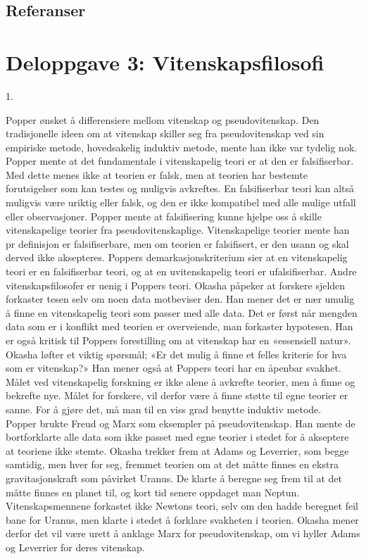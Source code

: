 \documentclass[
  letterpaper,
  DIV=11,
  numbers=noendperiod]{scrreprt}
\begin{document}
\hypertarget{referanser-1}{%
\section{Referanser}\label{referanser-1}}


\hypertarget{deloppgave-3-vitenskapsfilosofi}{%
\chapter{Deloppgave 3:
Vitenskapsfilosofi}\label{deloppgave-3-vitenskapsfilosofi}}

1.

Popper ønsket å differensiere mellom vitenskap og pseudovitenskap. Den
tradisjonelle ideen om at vitenskap skiller seg fra pseudovitenskap ved
sin empiriske metode, hovedsakelig induktiv metode, mente han ikke var
tydelig nok. Popper mente at det fundamentale i vitenskapelig teori er
at den er falsifiserbar. Med dette menes ikke at teorien er falsk, men
at teorien har bestemte forutsigelser som kan testes og muligvis
avkreftes. En falsifiserbar teori kan altså muligvis være uriktig eller
falsk, og den er ikke kompatibel med alle mulige utfall eller
observasjoner. Popper mente at falsifisering kunne hjelpe oss å skille
vitenskapelige teorier fra pseudovitenskaplige. Vitenskapelige teorier
mente han pr definisjon er falsifiserbare, men om teorien er
falsifisert, er den usann og skal derved ikke aksepteres. Poppers
demarkasjonskriterium sier at en vitenskapelig teori er en falsifiserbar
teori, og at en uvitenskapelig teori er ufalsifiserbar. Andre
vitenskapsfilosofer er uenig i Poppers teori. Okasha påpeker at forskere
sjelden forkaster tesen selv om noen data motbeviser den. Han mener det
er nær umulig å finne en vitenskapelig teori som passer med alle data.
Det er først når mengden data som er i konflikt med teorien er
overveiende, man forkaster hypotesen. Han er også kritisk til Poppers
forestilling om at vitenskap har en «essensiell natur». Okasha løfter et
viktig spørsmål; «Er det mulig å finne et felles kriterie for hva som er
vitenskap?» Han mener også at Poppers teori har en åpenbar svakhet.
Målet ved vitenskapelig forskning er ikke alene å avkrefte teorier, men
å finne og bekrefte nye. Målet for forskere, vil derfor være å finne
støtte til egne teorier er sanne. For å gjøre det, må man til en viss
grad benytte induktiv metode.\\

Popper brukte Freud og Marx som eksempler på pseudovitenskap. Han mente
de bortforklarte alle data som ikke passet med egne teorier i stedet for
å akseptere at teoriene ikke stemte. Okasha trekker frem at Adams og
Leverrier, som begge samtidig, men hver for seg, fremmet teorien om at
det måtte finnes en ekstra gravitasjonskraft som påvirket Uranus. De
klarte å beregne seg frem til at det måtte finnes en planet til, og kort
tid senere oppdaget man Neptun. Vitenskapsmennene forkastet ikke Newtons
teori, selv om den hadde beregnet feil bane for Uranus, men klarte i
stedet å forklare svakheten i teorien. Okasha mener derfor det vil være
urett å anklage Marx for pseudovitenskap, om vi hyller Adams og
Leverrier for deres vitenskap.
\end{document}
